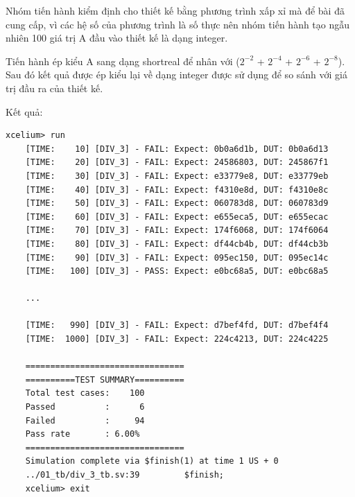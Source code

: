 \newpage
{}

  

\newpage
{}

Nhóm tiến hành kiểm định cho thiết kế bằng phương trình xấp xỉ mà để bài đã cung cấp, vì các hệ số của phương trình là số thực nên nhóm tiến hành tạo ngẫu nhiên 100 giá trị A đầu vào thiết kế là dạng integer. 

Tiến hành ép kiểu A sang dạng shortreal để nhân với ($2^{-2}$ + $2^{-4}$ + $2^{-6}$ + $2^{-8}$).
Sau đó kết quả được ép kiểu lại về dạng integer được sử dụng để so sánh với giá trị đầu ra của thiết kế.



Kết quả:

\begin{lstlisting}[style=StyleResult, language=Result, caption={Kết quả kiểm định cho bộ xấp xỉ chia 3.}]
	xcelium> run
	[TIME:    10] [DIV_3] - FAIL: Expect: 0b0a6d1b, DUT: 0b0a6d13 
	[TIME:    20] [DIV_3] - FAIL: Expect: 24586803, DUT: 245867f1 
	[TIME:    30] [DIV_3] - FAIL: Expect: e33779e8, DUT: e33779eb 
	[TIME:    40] [DIV_3] - FAIL: Expect: f4310e8d, DUT: f4310e8c 
	[TIME:    50] [DIV_3] - FAIL: Expect: 060783d8, DUT: 060783d9 
	[TIME:    60] [DIV_3] - FAIL: Expect: e655eca5, DUT: e655ecac 
	[TIME:    70] [DIV_3] - FAIL: Expect: 174f6068, DUT: 174f6064 
	[TIME:    80] [DIV_3] - FAIL: Expect: df44cb4b, DUT: df44cb3b 
	[TIME:    90] [DIV_3] - FAIL: Expect: 095ec150, DUT: 095ec14c 
	[TIME:   100] [DIV_3] - PASS: Expect: e0bc68a5, DUT: e0bc68a5 
	
	...
	
	[TIME:   990] [DIV_3] - FAIL: Expect: d7bef4fd, DUT: d7bef4f4 
	[TIME:  1000] [DIV_3] - FAIL: Expect: 224c4213, DUT: 224c4225 
	
	================================
	==========TEST SUMMARY==========
	Total test cases:    100    
	Passed          :      6    
	Failed          :     94    
	Pass rate       : 6.00%
	================================
	Simulation complete via $finish(1) at time 1 US + 0
	../01_tb/div_3_tb.sv:39         $finish;
	xcelium> exit
	
\end{lstlisting}
 
